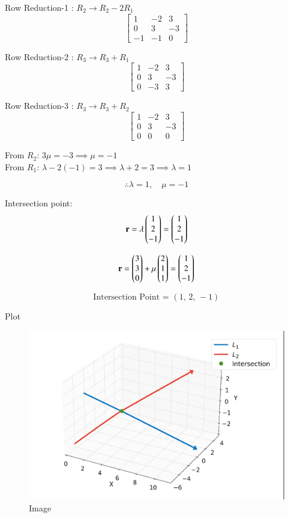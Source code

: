 \documentclass{beamer}
\begin{document}
\begin{frame}
Row Reduction-1 : $R_2 \rightarrow R_2 - 2 R_1$
\[
\left[\begin{array}{rr|r}
1 & -2 & 3 \\[1mm]
0 & 3 & -3 \\[1mm]
-1 & -1 & 0
\end{array}\right]
\]

Row Reduction-2 : $R_3 \rightarrow R_3 + R_1$
\[
\left[\begin{array}{rr|r}
1 & -2 & 3 \\[1mm]
0 & 3 & -3 \\[1mm]
0 & -3 & 3
\end{array}\right]
\]

Row Reduction-3 : $R_3 \rightarrow R_3 + R_2$
\[
\left[\begin{array}{rr|r}
1 & -2 & 3 \\[1mm]
0 & 3 & -3 \\[1mm]
0 & 0 & 0
\end{array}\right]
\]

From $R_2$: $3 \mu = -3 \implies \mu = -1$ \\
From $R_1$: $\lambda - 2(-1) = 3 \implies \lambda + 2 = 3 \implies \lambda = 1$
\end{frame}
\begin{frame}
    \[
\therefore \lambda = 1, \quad \mu = -1
\]

Intersection point:
\[
\mathbf{r} = \lambda \begin{pmatrix}1\\2\\-1\end{pmatrix} = \begin{pmatrix}1\\2\\-1\end{pmatrix}
\]

\[
\mathbf{r} = \begin{pmatrix}3\\3\\0\end{pmatrix} + \mu \begin{pmatrix}2\\1\\1\end{pmatrix} = \begin{pmatrix}1\\2\\-1\end{pmatrix}
\]

\[
\boxed{\text{Intersection Point = } (1,\,2,\,-1)}
\]

\end{frame}


\begin{frame}{Plot}
    \begin{figure}
        \centering
        \includegraphics[width=0.75\linewidth]{figs/image.png}
        \caption{Image}
        \label{fig:placeholder}
    \end{figure}
\end{frame}
\end{document}
